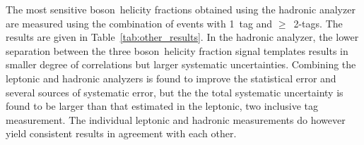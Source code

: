 The most sensitive \w boson\ helicity fractions obtained using the hadronic analyzer are measured using the combination of events with 1~\bt tag and $\geq$~2\bt-tags. The results are given in Table~\ref{tab:other_results}. In the hadronic analyzer, the lower separation between the three \w boson\ helicity fraction signal templates results in smaller degree of correlations but larger systematic uncertainties. Combining the leptonic and hadronic analyzers is found to improve the statistical error and several sources of systematic error, but the the total systematic uncertainty is found to be larger than that estimated in the leptonic, two inclusive \bt tag measurement. The individual leptonic and hadronic measurements do however yield consistent results in agreement with each other.


